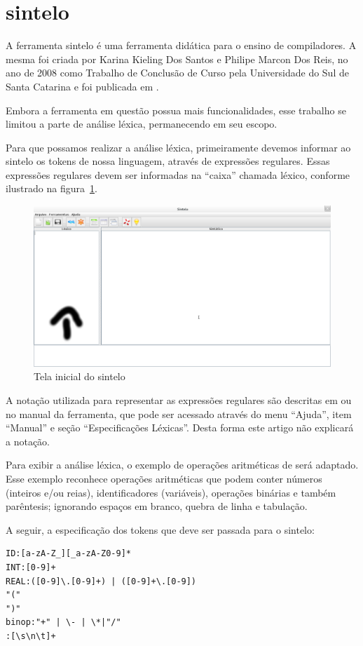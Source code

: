 \section{sintelo} %
\label{sec:sintelo}
A ferramenta sintelo é uma ferramenta didática para o ensino de compiladores. A mesma foi criada por Karina Kieling Dos Santos e Philipe Marcon Dos Reis, no ano de 2008 como Trabalho de Conclusão de Curso pela Universidade
do Sul de Santa Catarina e foi publicada em \cite{sintelo}. 

Embora a ferramenta em questão possua mais funcionalidades, esse trabalho se limitou a parte de análise léxica, permanecendo em seu escopo.

Para que possamos realizar a análise léxica, primeiramente devemos informar ao sintelo os tokens de nossa linguagem, através de expressões regulares. Essas expressões regulares devem ser informadas na ``caixa'' chamada léxico, conforme ilustrado na figura~\ref{sintelo-inicial}.

\begin{figure}[ht!]
	\centering
	\includegraphics[scale=0.28]{imgs/sintelo-inicial-ed}
	\caption{Tela inicial do sintelo}
	\label{sintelo-inicial}
\end{figure}

A notação utilizada para representar as expressões regulares são descritas em \cite{sintelo} ou no manual da ferramenta, que pode ser acessado através do menu ``Ajuda'', item ``Manual'' e seção ``Especificações Léxicas''. Desta forma este artigo não explicará a notação.

Para exibir a análise léxica, o exemplo de operações aritméticas de \cite{Sebesta201201} será adaptado. Esse exemplo reconhece operações aritméticas que podem conter números (inteiros e/ou reias), identificadores (variáveis), operações binárias e também parêntesis; ignorando espaços em branco, quebra de linha e tabulação.

A seguir, a especificação dos tokens que deve ser passada para o sintelo:
\begin{verbatim}
ID:[a-zA-Z_][_a-zA-Z0-9]*
INT:[0-9]+
REAL:([0-9]\.[0-9]+) | ([0-9]+\.[0-9])
"("
")"
binop:"+" | \- | \*|"/"
:[\s\n\t]+
\end{verbatim}


